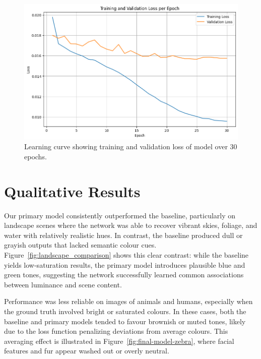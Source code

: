 \documentclass{article} %
\begin{document}
\begin{figure}[htbp]            %
  \centering
  \includegraphics[width=0.9\linewidth]{Figs/loss_curve.png}
  \caption{Learning curve showing training and validation loss of model over 30 epochs.}
  \label{fig:loss_curve}
\end{figure}

\section{Qualitative Results}
\label{qual_results}

Our primary model consistently outperformed the baseline, particularly on landscape scenes where the network was able to recover vibrant skies, foliage, and water with relatively 
realistic hues. In contrast, the baseline produced dull or grayish outputs that lacked semantic colour cues. Figure~\ref{fig:landscape_comparison} shows this clear contrast: while 
the baseline yields low-saturation results, the primary model introduces plausible blue and green tones, suggesting the network successfully learned common associations between luminance 
and scene content.

Performance was less reliable on images of animals and humans, especially when the ground truth involved bright or saturated colours. In these cases, both the baseline and primary models 
tended to favour brownish or muted tones, likely due to the loss function penalizing deviations from average colours. This averaging effect is illustrated in Figure~\ref{fig:final-model-zebra},
where facial features and fur appear washed out or overly neutral.
\end{document}
